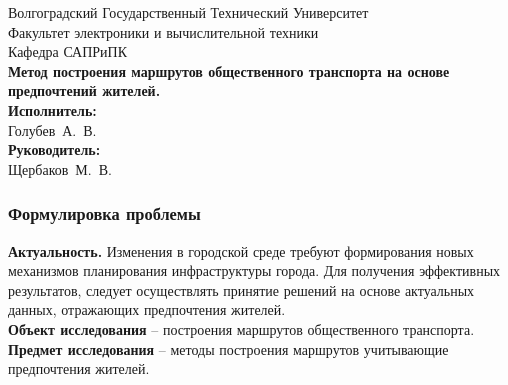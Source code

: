 \begin{frame}
    \begin{center}
        \small
        Волгоградский Государственный Технический Университет \\
        Факультет электроники и вычислительной техники \\
        Кафедра САПРиПК \\
        \vspace{1.5cm}
        \normalsize
        \textbf{Метод построения маршрутов общественного транспорта на основе 
        предпочтений жителей.}\\
        \vspace{1.0cm}
        \raggedleft\small
        \textbf{Исполнитель:}\\Голубев~А.~В.\\
        \textbf{Руководитель:}\\Щербаков~М.~В.\\
        \vspace{1.5cm}
        \vspace{\fill}
         \the\year
    \end{center}
\end{frame}

\begin{frame}
    \frametitle{Формулировка проблемы}
    \textbf{Актуальность.} Изменения в городской среде требуют формирования новых 
    механизмов планирования инфраструктуры города. Для получения эффективных 
    результатов, следует осуществлять принятие решений на основе актуальных 
    данных, отражающих предпочтения жителей.\\
    \textbf{Объект исследования} -- построения маршрутов общественного транспорта.\\
    \textbf{Предмет исследования} -- методы построения маршрутов учитывающие предпочтения жителей.
\end{frame}

